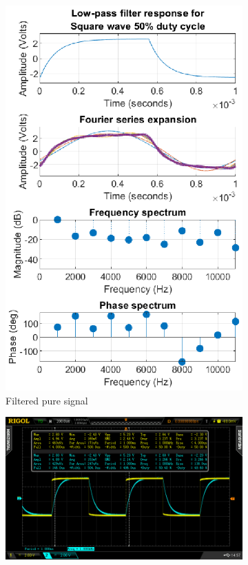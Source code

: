 \documentclass[notitlepage, a4paper, 11pt]{article}
\begin{document}
\begin{figure}[H]
\begin{subfigure}[][][t]{0.26\textwidth}
			\includegraphics[width=\textwidth]{../Matlab/img/RCLPsqr50}
			\caption{Filtered pure signal}
		\end{subfigure}
		\hfill
		\begin{subfigure}[][][t]{0.45\textwidth}
			\includegraphics[width=\textwidth, trim=85 50 112 45, clip]{../img/osc/DS2_QuickPrint4.png}

\end{subfigure}
\end{figure}
\end{document}
